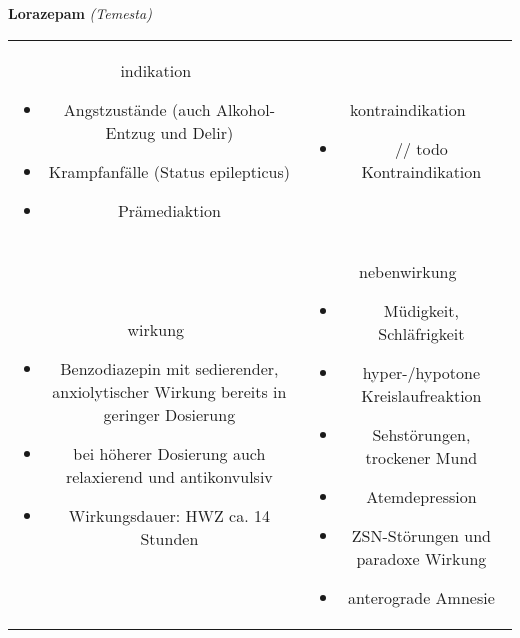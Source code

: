 \begin{frame}{
    \textbf{Lorazepam}
    \textit{(Temesta)}
}
    \begin{tabular}{c c}
        \begin{beamercolorbox}[wd=\boxwidth\textwidth,ht=\boxheight\textheight,sep=1em]{indikation}
            \begin{itemize}
                \item Angstzustände (auch Alkohol-Entzug und Delir)
                \item Krampfanfälle (Status epilepticus)
                \item Prämediaktion
            \end{itemize}
        \end{beamercolorbox} & 
        \begin{beamercolorbox}[wd=\boxwidth\textwidth,ht=\boxheight\textheight,sep=1em]{kontraindikation}
            \begin{itemize}
                \item // todo Kontraindikation 
            \end{itemize}
        \end{beamercolorbox} \\
        \begin{beamercolorbox}[wd=\boxwidth\textwidth,ht=\boxheight\textheight,sep=1em]{wirkung}
            \begin{itemize}
                \item Benzodiazepin mit sedierender, anxiolytischer Wirkung bereits in geringer Dosierung
                \item bei höherer Dosierung auch relaxierend und antikonvulsiv
                \item Wirkungsdauer: HWZ ca. 14 Stunden
            \end{itemize}
        \end{beamercolorbox} & 
        \begin{beamercolorbox}[wd=\boxwidth\textwidth,ht=\boxheight\textheight,sep=1em]{nebenwirkung}
            \begin{itemize}
                \item Müdigkeit, Schläfrigkeit
                \item hyper-/hypotone Kreislaufreaktion
                \item Sehstörungen, trockener Mund
                \item Atemdepression
                \item ZSN-Störungen und paradoxe Wirkung
                \item anterograde Amnesie
            \end{itemize}
        \end{beamercolorbox} \\
    \end{tabular}
\end{frame}

